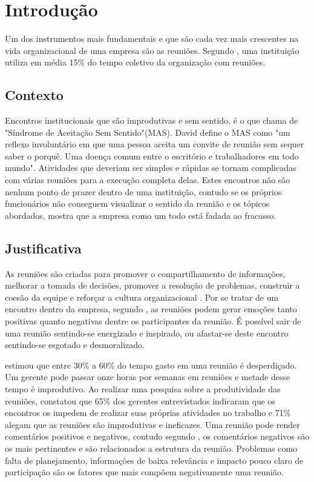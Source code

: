 \chapter[Introdução]{Introdução}
\label{cp:introducao}

Um dos instrumentos mais fundamentais e que são cada vez mais crescentes na vida organizacional de uma empresa são as reuniões. Segundo , uma instituição utiliza em média 15\% do tempo coletivo da organização com reuniões.

\section{Contexto}
\label{sec:contexto}

Encontros institucionais que são improdutivas e sem sentido, é o que  chama de "Síndrome de Aceitação Sem Sentido"(MAS). David define o MAS como "um reflexo involuntário em que uma pessoa aceita um convite de reunião sem sequer saber o porquê. Uma doença comum entre o escritório e trabalhadores em todo mundo". Atividades que deveriam ser simples e rápidas se tornam complicadas com várias reuniões para a execução completa delas. Estes encontros não são nenhum ponto de prazer dentro de uma instituição, contudo se os próprios funcionários não conseguem visualizar o sentido da reunião e os tópicos abordados, mostra que a empresa como um todo está fadada ao fracasso.

\section{Justificativa}
\label{sec:justificativa}

As reuniões são criadas para promover o compartilhamento de informações, melhorar a tomada de decisões, promover a resolução de problemas, construir a coesão da equipe e reforçar a cultura organizacional . Por se tratar de um encontro dentro da empresa, segundo , as reuniões podem gerar emoções tanto positivas quanto negativas dentre os participantes da reunião. É possível sair de uma reunião sentindo-se energizado e inspirado, ou afastar-se deste encontro sentindo-se esgotado e desmoralizado.  

 estimou que entre 30\% a 60\% do tempo gasto em uma reunião é desperdiçado. Um gerente pode passar onze horas por semanas em reuniões e metade desse tempo é improdutivo. Ao realizar uma pesquisa sobre a produtividade das reuniões,  constatou que 65\% dos gerentes entrevistados indicaram que os encontros os impedem de realizar suas próprias atividades no trabalho e 71\% alegam que as reuniões são improdutivas e ineficazes. Uma reunião pode render comentários positivos e negativos, contudo segundo , os comentários negativos são os mais pertinentes e são relacionados a estrutura da reunião. Problemas como falta de planejamento, informações de baixa relevância e impacto pouco claro de participação são os fatores que mais compõem negativamente uma reunião.

